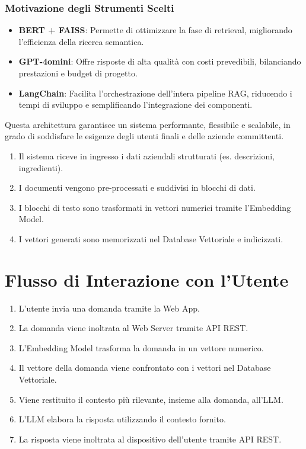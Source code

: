 \subsubsection{Motivazione degli Strumenti Scelti}
\begin{itemize}
    \item \textbf{BERT + FAISS}: Permette di ottimizzare la fase di retrieval, migliorando l’efficienza della ricerca semantica.
    \item \textbf{GPT-4omini}: Offre risposte di alta qualità con costi prevedibili, bilanciando prestazioni e budget di progetto.
    \item \textbf{LangChain}: Facilita l’orchestrazione dell'intera pipeline RAG, riducendo i tempi di sviluppo e semplificando l’integrazione dei componenti.
\end{itemize}

Questa architettura garantisce un sistema performante, flessibile e scalabile, in grado di soddisfare le esigenze degli utenti finali e delle aziende committenti.

\begin{enumerate}
    \item Il sistema riceve in ingresso i dati aziendali strutturati (es. descrizioni, ingredienti).
    \item I documenti vengono pre-processati e suddivisi in blocchi di dati.
    \item I blocchi di testo sono trasformati in vettori numerici tramite l'Embedding Model.
    \item I vettori generati sono memorizzati nel Database Vettoriale e indicizzati.
\end{enumerate}

\section*{Flusso di Interazione con l'Utente}

\begin{enumerate}
    \item L'utente invia una domanda tramite la Web App.
    \item La domanda viene inoltrata al Web Server tramite API REST.
    \item L'Embedding Model trasforma la domanda in un vettore numerico.
    \item Il vettore della domanda viene confrontato con i vettori nel Database Vettoriale.
    \item Viene restituito il contesto più rilevante, insieme alla domanda, all'LLM.
    \item L'LLM elabora la risposta utilizzando il contesto fornito.
    \item La risposta viene inoltrata al dispositivo dell'utente tramite API REST.
\end{enumerate}

